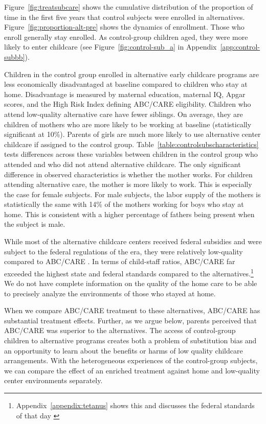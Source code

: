 Figure~\ref{fig:treatsubcare} shows the cumulative distribution of the proportion of time in the first five years that control subjects were enrolled in alternatives. Figure~\ref{fig:proportion-alt-pre} shows the dynamics of enrollment. Those who enroll generally stay enrolled. As control-group children aged, they were more likely to enter childcare (see Figure~\ref{fig:control-sub_a} in Appendix~\ref{app:control-subbb}).

Children in the control group enrolled in alternative early childcare programs are less economically disadvantaged at baseline compared to children who stay at home. Disadvantage is measured by maternal education, maternal IQ, Apgar scores, and the High Risk Index defining ABC/CARE eligibility. Children who attend low-quality alternative care have fewer siblings. On average, they are children of mothers who are more likely to be working at baseline (statistically significant at 10\%). Parents of girls are much more likely to use alternative center childcare if assigned to the control group. Table~\ref{table:controlsubscharacteristics} tests differences across these variables between children in the control group who attended and who did not attend alternative childcare. The only significant difference in observed characteristics is whether the mother works. For children attending alternative care, the mother is more likely to work. This is especially the case for female subjects. For male subjects, the labor supply of the mothers is statistically the same with 14\% of the mothers working for boys who stay at home. This is consistent with a higher percentage of fathers being present when the subject is male.

While most of the alternative childcare centers received federal subsidies and were subject to the federal regulations of the era, they were relatively low-quality compared to ABC/CARE \citep{Burchinal_etal_1989_CD_Daycare-Pre-K-Dev}. In terms of child-staff ratios, ABC/CARE far exceeded the highest state and federal standards compared to the alternatives.\footnote{Appendix~\ref{appendix:tetanus} shows this and discusses the federal standards of that day \citep{Department-of-Health_1968_DayCareRequirements,NCGA_1971_House-Bill-100,Ramey-et-al_1977_Intro-to-ABC,Ramey_Campbell_1979_SR,Ramey_McGinness_etal_1982_Abecedarianapproach,Burchinal_Campbell_etal_1997_CD}} We do not have complete information on the quality of the home care to be able to precisely analyze the environments of those who stayed at home. 

When we compare ABC/CARE treatment to these alternatives, ABC/CARE has substantial treatment effects. Further, as we argue below, parents perceived that ABC/CARE was superior to the alternatives. The access of control-group children to alternative programs creates both a problem of substitution bias \citep{Heckman_1992_randomization,Heckman_Hohmann_etal_2000_QJE, Kline_Walters_2016_QJE} and an opportunity to learn about the benefits or harms of low quality childcare arrangements. With the heterogeneous experiences of the control-group subjects, we can compare the effect of an enriched treatment against home and low-quality center environments separately.

